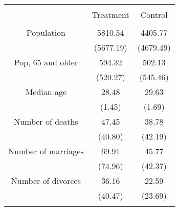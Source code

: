 
\begin{tabular}{@{\extracolsep{25pt}} ccc} 
\\[-1.8ex]\hline 
\hline \\[-1.8ex] 
 & Treatment & Control \\ 
\hline \\[-1.8ex] 
Population & 5810.54 & 4405.77 \\ 
  & (5677.19) & (4679.49) \\ 
Pop, 65 and older & 594.32 & 502.13 \\ 
   & (520.27) & (545.46) \\ 
Median age & 28.48 & 29.63 \\ 
    & (1.45) & (1.69) \\ 
Number of deaths & 47.45 & 38.78 \\ 
     & (40.80) & (42.19) \\ 
Number of marriages & 69.91 & 45.77 \\ 
      & (74.96) & (42.37) \\ 
Number of divorces & 36.16 & 22.59 \\ 
       & (40.47) & (23.69) \\ 
\hline \\[-1.8ex] 
\end{tabular} 
